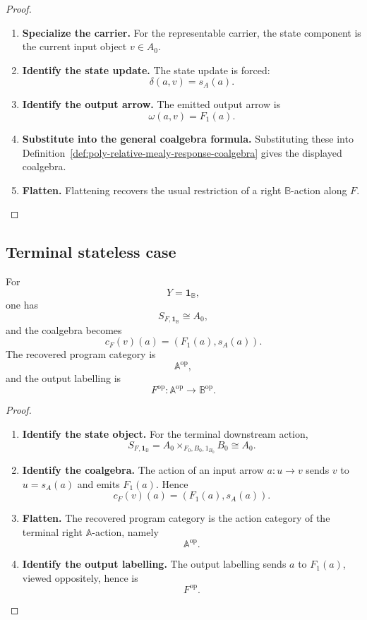 \begin{proof}
\leavevmode
\begin{enumerate}
\item \textbf{Specialize the carrier.}
For the representable carrier, the state component is the current input object
\(v\in A_0\).

\item \textbf{Identify the state update.}
The state update is forced:
\[
\delta(a,v)=s_A(a).
\]

\item \textbf{Identify the output arrow.}
The emitted output arrow is
\[
\omega(a,v)=F_1(a).
\]

\item \textbf{Substitute into the general coalgebra formula.}
Substituting these into
Definition~\ref{def:poly-relative-mealy-response-coalgebra} gives the
displayed coalgebra.

\item \textbf{Flatten.}
Flattening recovers the usual restriction of a right \(\mathbb B\)-action
along \(F\).
\end{enumerate}
\end{proof}

\subsection{Terminal stateless case}
\label{subsec:poly-relative-terminal-stateless-case}

\begin{corollary}
\label{cor:poly-relative-terminal-stateless-coalgebra}
For
\[
Y=\mathbf 1_{\mathbb B},
\]
one has
\[
S_{F,\mathbf 1_{\mathbb B}}\cong A_0,
\]
and the coalgebra becomes
\[
c_F(v)(a)=(F_1(a),s_A(a)).
\]
The recovered program category is
\[
\mathbb A^{\mathrm{op}},
\]
and the output labelling is
\[
F^{\mathrm{op}}:\mathbb A^{\mathrm{op}}\to\mathbb B^{\mathrm{op}}.
\]
\end{corollary}

\begin{proof}
\leavevmode
\begin{enumerate}
\item \textbf{Identify the state object.}
For the terminal downstream action,
\[
S_{F,\mathbf 1_{\mathbb B}}
=
A_0\times_{F_0,B_0,1_{B_0}}B_0
\cong A_0.
\]

\item \textbf{Identify the coalgebra.}
The action of an input arrow \(a:u\to v\) sends \(v\) to \(u=s_A(a)\) and
emits \(F_1(a)\).  Hence
\[
c_F(v)(a)=(F_1(a),s_A(a)).
\]

\item \textbf{Flatten.}
The recovered program category is the action category of the terminal right
\(\mathbb A\)-action, namely
\[
\mathbb A^{\mathrm{op}}.
\]

\item \textbf{Identify the output labelling.}
The output labelling sends \(a\) to \(F_1(a)\), viewed oppositely, hence is
\[
F^{\mathrm{op}}.
\]
\end{enumerate}
\end{proof}

